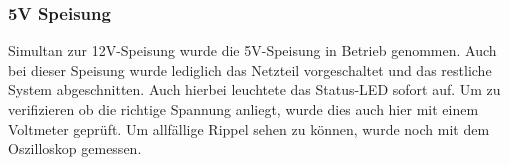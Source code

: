 \subsubsection{5V Speisung}
\label{subsubsec:Inbetriebnahme_5V_Speisungen}

Simultan zur 12V-Speisung wurde die 5V-Speisung in Betrieb genommen. Auch bei dieser Speisung wurde lediglich das Netzteil vorgeschaltet und das restliche System abgeschnitten. Auch hierbei leuchtete das Status-LED sofort auf. Um zu verifizieren ob die richtige Spannung anliegt, wurde dies auch hier mit einem Voltmeter geprüft. Um allfällige Rippel sehen zu können, wurde noch mit dem Oszilloskop gemessen.